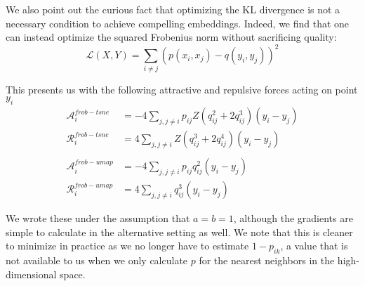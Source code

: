 \documentclass[sigconf, nonacm]{acmart}
\begin{document}
We also point out the curious fact that optimizing the KL divergence is not a necessary condition to achieve compelling embeddings. Indeed, we find that one can
instead optimize the squared Frobenius norm without sacrificing quality:
\[ \mathcal{L}(X, Y) = \sum_{i \neq j} (p(x_i, x_j) - q(y_i, y_j))^2 \]

This presents us with the following attractive and repulsive forces acting on point $y_i$
\begin{align*}
    \mathcal{A}_i^{frob-tsne} &= -4 \sum_{j, j \neq i} p_{ij} Z (q_{ij}^2 + 2q_{ij}^3) (y_i - y_j) \\
    \mathcal{R}_i^{frob-tsne} &= 4 \sum_{j, j \neq i} Z( q_{ij}^3 + 2q_{ij}^4) (y_i - y_j) \\
    &\\
    \mathcal{A}_i^{frob-umap} &= -4 \sum_{j, j \neq i} p_{ij} q_{ij}^2 (y_i - y_j) \\
    \mathcal{R}_i^{frob-umap} &= 4 \sum_{j, j \neq i} q_{ij}^3 (y_i - y_j)  
\end{align*}

We wrote these under the assumption that $a = b = 1$, although the gradients are simple to calculate in the alternative setting as well. We note that this is
cleaner to minimize in practice as we no longer have to estimate $1 - p_{ik}$, a value that is not available to us when we only calculate $p$ for the nearest
neighbors in the high-dimensional space.
\end{document}
